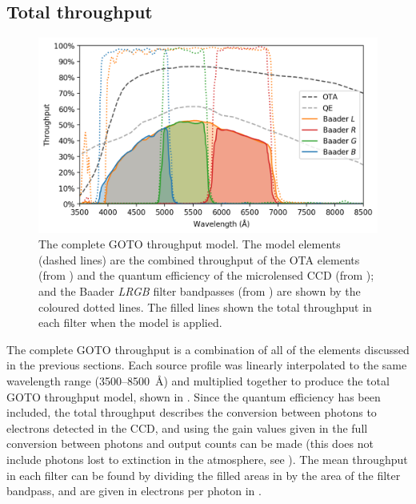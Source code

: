 
\subsection{Total throughput}
\label{sec:total_throughput}
\begin{colsection}

\begin{figure}[t]
    \begin{center}
        \includegraphics[width=\linewidth]{images/throughput/throughput.png}
    \end{center}
    \caption[Complete throughput model for the GOTO filters]{
        The complete GOTO throughput model. The model elements (dashed lines) are the combined throughput of the OTA elements (from ) and the quantum efficiency of the microlensed CCD (from ); and the Baader \textit{LRGB} filter bandpasses (from ) are shown by the coloured dotted lines. The filled lines shown the total throughput in each filter when the model is applied.
    }\label{fig:throughput}
\end{figure}

The complete GOTO throughput is a combination of all of the elements discussed in the previous sections. Each source profile was linearly interpolated to the same wavelength range (3500--\SI{8500}{\angstrom}) and multiplied together to produce the total GOTO throughput model, shown in . Since the quantum efficiency has been included, the total throughput describes the conversion between photons to electrons detected in the CCD, and using the gain values given in  the full conversion between photons and output counts can be made (this does not include photons lost to extinction in the atmosphere, see ). The mean throughput in each filter can be found by dividing the filled areas in  by the area of the filter bandpass, and are given in electrons per photon in .

\newpage

\end{colsection}

